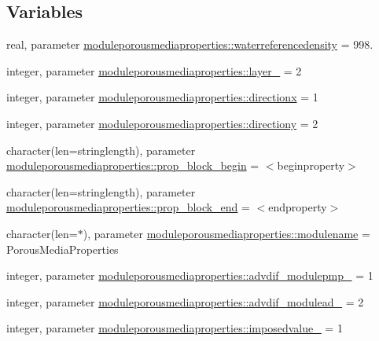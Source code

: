 \subsection*{Variables}
\begin{DoxyCompactItemize}
\item 
real, parameter \mbox{\hyperlink{namespacemoduleporousmediaproperties_a7934d23c9d533535b043423188f8010a}{moduleporousmediaproperties\+::waterreferencedensity}} = 998.
\item 
integer, parameter \mbox{\hyperlink{namespacemoduleporousmediaproperties_a7489983ae12c2122d5feb988c8b3ad36}{moduleporousmediaproperties\+::layer\+\_\+}} = 2
\item 
integer, parameter \mbox{\hyperlink{namespacemoduleporousmediaproperties_af3ed469348d3d6a26909648a47f56e8a}{moduleporousmediaproperties\+::directionx}} = 1
\item 
integer, parameter \mbox{\hyperlink{namespacemoduleporousmediaproperties_a2fe7588436daae719ede5ee48e9dea60}{moduleporousmediaproperties\+::directiony}} = 2
\item 
character(len=stringlength), parameter \mbox{\hyperlink{namespacemoduleporousmediaproperties_abc69e8111d903d795ba37cf29a05f780}{moduleporousmediaproperties\+::prop\+\_\+block\+\_\+begin}} = \textquotesingle{}$<$beginproperty$>$\textquotesingle{}
\item 
character(len=stringlength), parameter \mbox{\hyperlink{namespacemoduleporousmediaproperties_a7e051a4d35d9a334e59f188d76d5ef99}{moduleporousmediaproperties\+::prop\+\_\+block\+\_\+end}} = \textquotesingle{}$<$endproperty$>$\textquotesingle{}
\item 
character(len=$\ast$), parameter \mbox{\hyperlink{namespacemoduleporousmediaproperties_a587732ce97c9a6cb0c8330a1c0aed2f1}{moduleporousmediaproperties\+::modulename}} = \textquotesingle{}Porous\+Media\+Properties\textquotesingle{}
\item 
integer, parameter \mbox{\hyperlink{namespacemoduleporousmediaproperties_a71c8fa9cb77e17cfd7f683e3972580cd}{moduleporousmediaproperties\+::advdif\+\_\+modulepmp\+\_\+}} = 1
\item 
integer, parameter \mbox{\hyperlink{namespacemoduleporousmediaproperties_a5fb79cc3aa76009c87d9dfcace7c7ed3}{moduleporousmediaproperties\+::advdif\+\_\+modulead\+\_\+}} = 2
\item 
integer, parameter \mbox{\hyperlink{namespacemoduleporousmediaproperties_ab1806e49e85d996baa1b6916d45f0cc6}{moduleporousmediaproperties\+::imposedvalue\+\_\+}} = 1
\item 

\end{DoxyCompactItemize}
